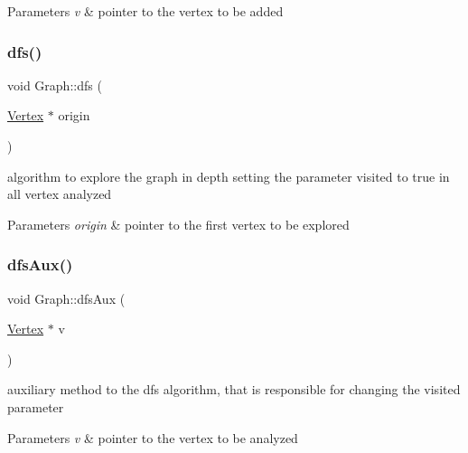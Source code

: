 \begin{DoxyParams}{Parameters}
{\em v} & pointer to the vertex to be added \\
\hline
\end{DoxyParams}
\hypertarget{class_graph_adb546d755f7529e114566bb27e91272e}{}\label{class_graph_adb546d755f7529e114566bb27e91272e} 
\subsubsection{\texorpdfstring{dfs()}{dfs()}}
{\footnotesize\ttfamily void Graph\+::dfs (\begin{DoxyParamCaption}\item[{\hyperlink{class_vertex}{Vertex} $\ast$}]{origin }\end{DoxyParamCaption})}



algorithm to explore the graph in depth setting the parameter visited to true in all vertex analyzed 


\begin{DoxyParams}{Parameters}
{\em origin} & pointer to the first vertex to be explored \\
\hline
\end{DoxyParams}
\hypertarget{class_graph_ae2d00529a368c8651c378857852c9946}{}\label{class_graph_ae2d00529a368c8651c378857852c9946} 
\subsubsection{\texorpdfstring{dfs\+Aux()}{dfsAux()}}
{\footnotesize\ttfamily void Graph\+::dfs\+Aux (\begin{DoxyParamCaption}\item[{\hyperlink{class_vertex}{Vertex} $\ast$}]{v }\end{DoxyParamCaption})}



auxiliary method to the dfs algorithm, that is responsible for changing the visited parameter 


\begin{DoxyParams}{Parameters}
{\em v} & pointer to the vertex to be analyzed \\
\hline
\end{DoxyParams}
\hypertarget{class_graph_a2005ebde6efc1ec28733fafe6a346ccb}{}\label{class_graph_a2005ebde6efc1ec28733fafe6a346ccb} 
